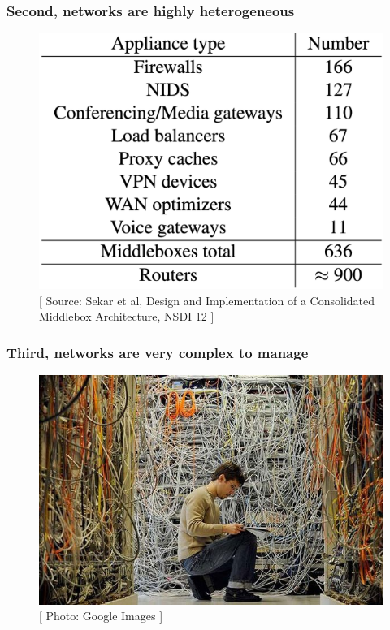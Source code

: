 \documentclass{beamer}
\begin{document}
\begin{frame}
  \frametitle{Second, networks are highly heterogeneous}
  \begin{figure}
    \begin{center}
      \includegraphics[scale=0.25]{images/sdn-3}
    \end{center}
    
    \caption{\small{[ Source: Sekar et al, Design and Implementation of a Consolidated Middlebox Architecture, NSDI 12 ]}}
  \end{figure}
\end{frame}
\begin{frame}
  \frametitle{Third, networks are very complex to manage}
  \begin{figure}
    \begin{center}
      \includegraphics[scale=0.25]{images/sdn-4}
    \end{center}
    
    \caption{\small{[ Photo: Google Images ]}}
  \end{figure}
\end{frame}
\end{document}
